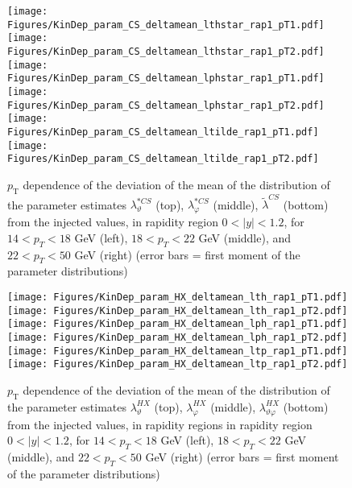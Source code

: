 \documentclass[12pt]{article}
\newcommand{\pT}{p_\mathrm{T}}
\newcommand{\absy}{\left |  y \right |}
\newcommand{\lamtildeCS}{\tilde{\lambda}^{\scriptscriptstyle CS}}
\newcommand{\lamthstarCS}{\lambda^{* \scriptscriptstyle CS}_\vartheta}
\newcommand{\lamphstarCS}{\lambda^{* \scriptscriptstyle CS}_\varphi}
\newcommand{\lamthHX}{\lambda^{\scriptscriptstyle HX}_\vartheta}
\newcommand{\lamphHX}{\lambda^{\scriptscriptstyle HX}_\varphi}
\newcommand{\lamthphHX}{\lambda^{\scriptscriptstyle HX}_{\vartheta \varphi}}
\begin{document}
\begin{figure}[htbp]
\centering
\texttt{[image: Figures/KinDep\_param\_CS\_deltamean\_lthstar\_rap1\_pT1.pdf]}
\texttt{[image: Figures/KinDep\_param\_CS\_deltamean\_lthstar\_rap1\_pT2.pdf]}
\texttt{[image: Figures/KinDep\_param\_CS\_deltamean\_lphstar\_rap1\_pT1.pdf]}
\texttt{[image: Figures/KinDep\_param\_CS\_deltamean\_lphstar\_rap1\_pT2.pdf]}
\texttt{[image: Figures/KinDep\_param\_CS\_deltamean\_ltilde\_rap1\_pT1.pdf]}
\texttt{[image: Figures/KinDep\_param\_CS\_deltamean\_ltilde\_rap1\_pT2.pdf]}
\caption{$\pT$ dependence of the deviation of the mean of the distribution of
the parameter estimates $\lamthstarCS$ (top), $\lamphstarCS$ (middle),
$\lamtildeCS$ (bottom) from the injected values, in rapidity
region $0<\absy<1.2$, for $14 < p_T < 18$ GeV (left), $18 < p_T < 22$ GeV (middle), and $22 < p_T < 50$ GeV (right) (error bars = first moment of
the parameter distributions)}
\end{figure}
\clearpage









\begin{figure}[htbp]
\centering
\texttt{[image: Figures/KinDep\_param\_HX\_deltamean\_lth\_rap1\_pT1.pdf]}
\texttt{[image: Figures/KinDep\_param\_HX\_deltamean\_lth\_rap1\_pT2.pdf]}
\texttt{[image: Figures/KinDep\_param\_HX\_deltamean\_lph\_rap1\_pT1.pdf]}
\texttt{[image: Figures/KinDep\_param\_HX\_deltamean\_lph\_rap1\_pT2.pdf]}
\texttt{[image: Figures/KinDep\_param\_HX\_deltamean\_ltp\_rap1\_pT1.pdf]}
\texttt{[image: Figures/KinDep\_param\_HX\_deltamean\_ltp\_rap1\_pT2.pdf]}
\caption{$\pT$ dependence of the deviation of the mean of the distribution of
the parameter estimates $\lamthHX$ (top), $\lamphHX$ (middle), $\lamthphHX$
(bottom) from the injected values, in rapidity regions in rapidity
region $0<\absy<1.2$, for $14 < p_T < 18$ GeV (left), $18 < p_T < 22$ GeV (middle), and $22 < p_T < 50$ GeV (right) (error bars = first moment of the parameter
distributions)}
\end{figure}
\clearpage
\end{document}
